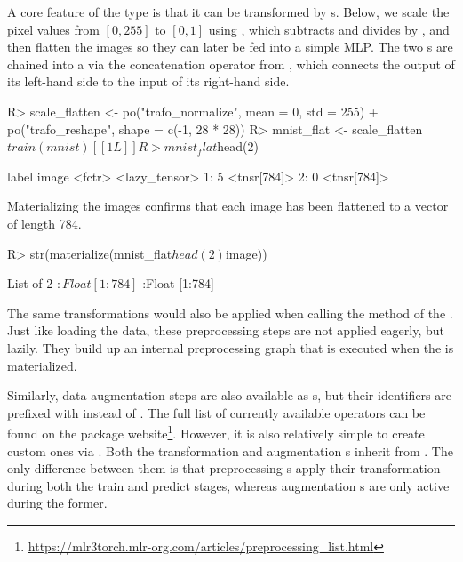 \documentclass[article,shortnames]{jss}
\theoremstyle{definition}
\renewenvironment{CodeChunk}{\par\addvspace{0.6\baselineskip}\noindent\begin{minipage}{\linewidth}}{\end{minipage}\par\vspace{0.6\baselineskip}}
\begin{document}
A core feature of the  type is that it can be transformed by s.
Below, we scale the pixel values from $[0, 255]$ to $[0, 1]$ using , which subtracts  and divides by , and then flatten the images so they can later be fed into a simple MLP.
The two s are chained into a  via the concatenation operator \code{\%\text{>}\text{>}\%} from \mlrtpipelines{}, which connects the output of its left-hand side to the input of its right-hand side.

\begin{CodeChunk}
\begin{CodeInput}
R> scale_flatten <- po("trafo_normalize", mean = 0, std = 255) %
+    po("trafo_reshape", shape = c(-1, 28 * 28))
R> mnist_flat <- scale_flatten$train(mnist)[[1L]]
R> mnist_flat$head(2)
\end{CodeInput}
\begin{CodeOutput}
    label         image
   <fctr> <lazy_tensor>
1:      5   <tnsr[784]>
2:      0   <tnsr[784]>
\end{CodeOutput}
\end{CodeChunk}

Materializing the images confirms that each image has been flattened to a vector of length 784.

\begin{CodeChunk}
\begin{CodeInput}
R> str(materialize(mnist_flat$head(2)$image))
\end{CodeInput}
\begin{CodeOutput}
List of 2
 $ :Float [1:784]
 $ :Float [1:784]
\end{CodeOutput}
\end{CodeChunk}

The same transformations would also be applied when calling the  method of the .
Just like loading the data, these preprocessing steps are not applied eagerly, but lazily.
They build up an internal preprocessing graph that is executed when the  is materialized.

Similarly, data augmentation steps are also available as s, but their identifiers are prefixed with  instead of .
The full list of currently available operators can be found on the package website\footnote{\url{https://mlr3torch.mlr-org.com/articles/preprocessing_list.html}}. However, it is also relatively simple to create custom ones via .
Both the transformation and augmentation s inherit from .
The only difference between them is that preprocessing s apply their transformation during both the train and predict stages, whereas augmentation s are only active during the former.
\end{document}
